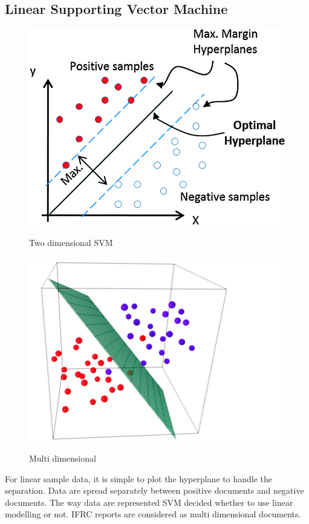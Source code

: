 \subsection{Linear Supporting Vector Machine }
\begin{figure}
\caption{Two dimensional SVM}
 \includegraphics[scale=.5]    	          {images/linear.png} \label{linear}
\end{figure}  
\begin{figure}
\caption{Multi dimensional}
    \includegraphics[scale=.7]    	              {images/multi.png}
                \label{multi}
\end{figure}
For linear sample data, it is simple to plot the hyperplane to handle the separation.  Data are spread separately between positive documents and negative documents. The way data are represented SVM decided  whether to use linear modelling or not. IFRC reports are considered as multi dimensional documents.

